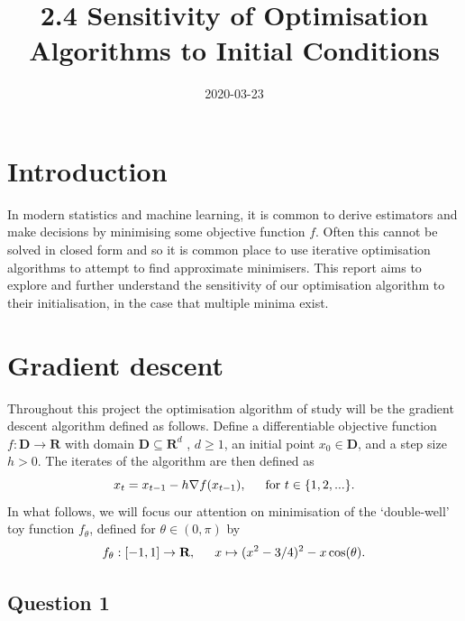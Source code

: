 \documentclass{article}
\title{2.4 Sensitivity of Optimisation Algorithms to Initial Conditions}
\date{2020-03-23}
\begin{document}
\maketitle

\section{Introduction}

In modern statistics and machine learning, it is common to derive estimators and make decisions by minimising some objective function $f$. Often this cannot be solved in closed form and so it is common place to use iterative optimisation algorithms to attempt to find approximate minimisers. This report aims to explore and further understand the sensitivity of our optimisation algorithm to their initialisation, in the case that multiple minima exist.

\newpage

\section{Gradient descent}

Throughout this project the optimisation algorithm of study will be the gradient descent algorithm defined as follows. Define a differentiable objective function $f : \textbf{D} \to \textbf{R} $ with domain $\textbf{D} \subseteq \textbf{R}^d$ , $d \geq 1$, an initial point $x_0 \in \textbf{D}$, and a step size $h > 0$. The iterates of the algorithm are then defined as 
\begin{equation}
x_t=x_{t-1}-h \nabla f(x_{t-1}), \indent  \text{for } t \in \{ 1,2,... \} .
\end{equation}
In what follows, we will focus our attention on minimisation of the ‘double-well’ toy function $f_\theta$, defined for $\theta \in (0, \pi)$ by
\begin{equation}
f_\theta : [-1,1] \to \textbf{R}, \indent x \mapsto (x^2 - 3/4)^2 - x \cos(\theta).
\end{equation}

\subsection{Question 1}
\end{document}
